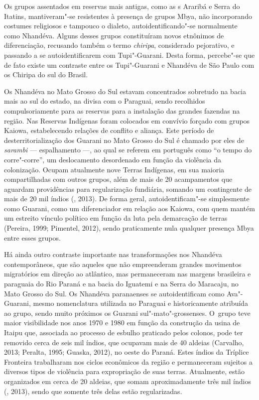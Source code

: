 Os grupos assentados em reservas mais antigas, como as s Araribá e
Serra do Itatins, mantiveram"-se resistentes à presença de grupos Mbya,
não incorporando costumes religiosos e tampouco o dialeto,
autoidentificando"-se normalmente como Nhandéva. Alguns desses grupos
constituíram novos etnônimos de diferenciação, recusando também o termo
\emph{chiripa}, considerado pejorativo, e passando a se autoidentificarem com
Tupi"-Guarani. Desta forma, percebe"-se que de fato existe um contraste
entre os Tupi"-Guarani e Nhandéva de São Paulo com os Chiripa do sul do
Brasil.

Os Nhandéva no Mato Grosso do Sul estavam concentrados sobretudo na
bacia mais ao sul do estado, na divisa com o Paraguai, sendo recolhidos
compulsoriamente para as reservas para a instalação das grandes
fazendas na região. Nas Reservas Indígenas foram colocados em convívio
forçado com grupos Kaiowa, estabelecendo relações de conflito e
aliança. Este período de desterritorialização dos Guarani no Mato
Grosso do Sul é chamado por eles de \emph{sarambi} --- espalhamento ---, ao qual
se referem em português como ``o tempo do corre"-corre'', um deslocamento
desordenado em função da violência da colonização. Ocupam atualmente
nove Terras Indígenas, em sua maioria compartilhadas com outros grupos,
além de mais de 20 acampamentos que aguardam providências para
regularização fundiária, somando um contingente de mais de 20 mil
índios (, 2013). De forma geral, autoidentificam"-se simplesmente
como Guarani, como um diferenciador em relação aos Kaiowa, com quem
mantém um estreito vínculo político em função da luta pela demarcação
de terras (Pereira, 1999; Pimentel, 2012), sendo praticamente nula
qualquer presença Mbya entre esses grupos.

Há ainda outro contraste importante nas transformações nos Nhandéva
contemporâneos, que são aqueles que não empreenderam grandes movimentos
migratórios em direção ao atlântico, mas permaneceram nas margens
brasileira e paraguaia do Rio Paraná e na bacia do Iguatemi e na Serra
do Maracaju, no Mato Grosso do Sul. Os Nhandéva paranaenses se
autoidentificam como Ava"-Guarani, mesmo nomenclatura utilizada no
Paraguai e historicamente atribuída ao grupo, sendo muito próximos os
Guarani sul"-mato"-grossenses. O~grupo teve maior visibilidade nos anos
1970 e 1980 em função da construção da usina de Itaipu que, associada
ao processo de esbulho praticado pelos colonos, pode ter removido cerca
de seis mil índios, que ocupavam mais de 40 aldeias (Carvalho, 2013;
Peralta, 1995; Guaska, 2012), no oeste do Paraná. Estes índios da
Tríplice Fronteira trabalharam nos ciclos econômicos da região e
permaneceram sujeitos a diversos tipos de violência para expropriação
de suas terras. Atualmente, estão organizados em cerca de 20 aldeias,
que somam aproximadamente três mil índios (, 2013), sendo que
somente três delas estão regularizadas.

